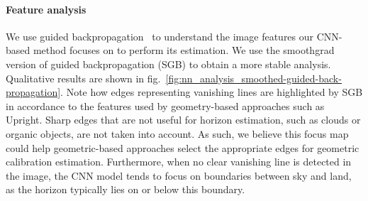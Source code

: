 \paragraph{Feature analysis} We use guided backpropagation~\cite{Springenberg2015} to understand the image features our CNN-based method focuses on to perform its estimation. We use the smoothgrad~\cite{smilkov-arxiv-17} version of guided backpropagation (SGB) to obtain a more stable analysis. Qualitative results are shown in fig.~\ref{fig:nn_analysis_smoothed-guided-back-propagation}. Note how edges representing vanishing lines are highlighted by SGB in accordance to the features used by geometry-based approaches such as Upright. Sharp edges that are not useful for horizon estimation, such as clouds or organic objects,  are not taken into account. As such, we believe this focus map could help geometric-based approaches select the appropriate edges for geometric calibration estimation. Furthermore, when no clear vanishing line is detected in the image, the CNN model tends to focus on boundaries between sky and land, as the horizon typically lies on or below this boundary.


